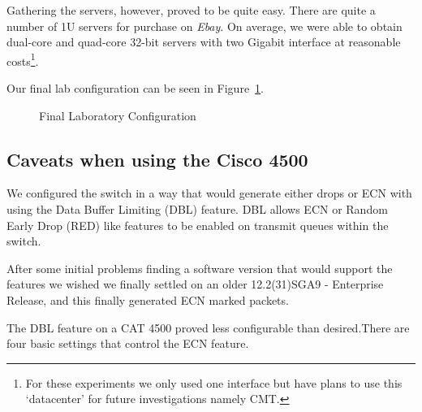 \documentclass[12pt]{article}
\begin{document}
Gathering the servers, however, proved to be quite easy. There are quite a number of 1U servers
for purchase on \emph{Ebay}. On average, we were able to obtain dual-core and quad-core 32-bit 
servers with two Gigabit interface at reasonable costs\footnote{For these experiments we only used
one interface but have plans to use this `datacenter' for future investigations  namely CMT.}. 

Our final lab configuration can be seen in Figure~\ref{fig:labconfig}.

\begin{figure}[h]
\centering
{}
\caption{Final Laboratory Configuration }
\label{fig:labconfig}
\end{figure}




\subsection{Caveats when using the Cisco 4500}

We configured the switch in a way that would generate either drops
or ECN with using the Data Buffer Limiting (DBL) feature. DBL allows ECN or Random Early
Drop (RED) like features to be enabled on transmit queues within the switch.

After some initial problems finding a software version that would
support the features we wished we finally settled on an older
12.2(31)SGA9 - Enterprise Release, and this finally generated
ECN marked packets.

The DBL feature on a CAT 4500 proved less configurable than desired.There are four
basic settings that control the ECN feature. 
\end{document}
